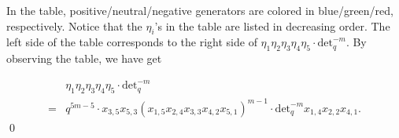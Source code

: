 \documentclass[table,a4paper,reqno]{amsart}
\numberwithin{equation}{section}
\theoremstyle{definition}
\begin{document}
In the table, positive/neutral/negative generators are colored in blue/green/red, respectively. Notice that the $\eta_i$'s in the table are listed in decreasing order. The left side of the table corresponds to the right side of $\eta_1\eta_2\eta_3\eta_4\eta_5\cdot\text{det}_q^{-m}$. By observing the table, we have get
\begin{samepage}
\begin{equation}\label{eq:3.40}
    \begin{split}
        &\eta_1\eta_2\eta_3\eta_4\eta_5\cdot\text{det}_q^{-m}\\
        =&q^{5m-5}\cdot x_{3,5}x_{5,3}(x_{1,5}x_{2,4}x_{3,3}x_{4,2}x_{5,1})^{m-1}\cdot\text{det}_q^{-m}x_{1,4}x_{2,2}x_{4,1}.
    \end{split}
\end{equation}\qed
\end{samepage}
\end{document}
